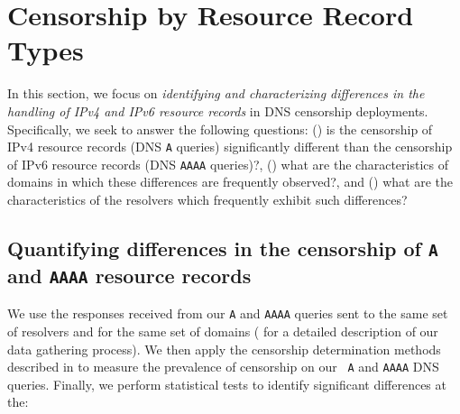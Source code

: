 \section{Censorship by Resource Record Types} \label{sec:resources}

In this section, we focus on {\it identifying and characterizing differences in
the handling of IPv4 and IPv6 resource records} in DNS censorship deployments.
Specifically, we seek to answer the following questions: 
%
() is the censorship of IPv4 resource records (DNS
{\tt A} queries) significantly different than the censorship of IPv6 resource
records (DNS {\tt AAAA} queries)?,
%
() what are the characteristics of domains in which
these differences are frequently observed?, and
%
() what are the characteristics of the resolvers
which frequently exhibit such differences?

\subsection{Quantifying differences in the censorship of \texttt{A} and
\texttt{AAAA} resource records} \label{sec:resources:sig}
%
We use the responses received from our {\tt A} and {\tt AAAA} queries sent to
the same set of resolvers and for the same set of domains (\cf
{} for a detailed description of our data gathering
process). We then apply the censorship determination methods described in
 to measure the prevalence of censorship on our {\tt
A} and {\tt AAAA} DNS queries. Finally, we perform statistical tests to
identify significant differences at the:

